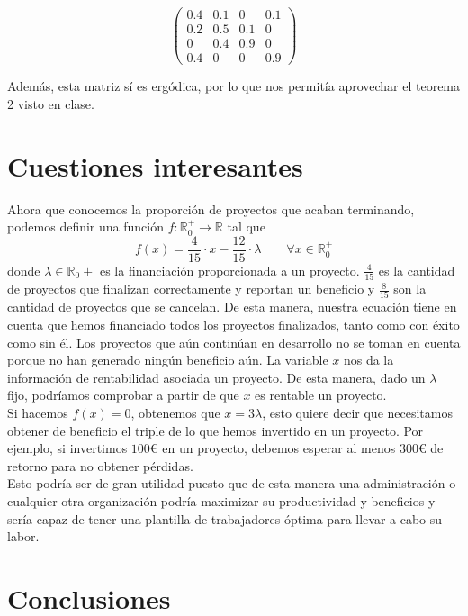 \documentclass[10pt,a4paper]{article}
\begin{document}
\[
\begin{pmatrix}
0.4 & 0.1 & 0 & 0.1 \\
0.2 & 0.5 & 0.1 & 0 \\
0 & 0.4 & 0.9 & 0 \\
0.4 & 0 & 0 & 0.9 
\end{pmatrix}
\]

Además, esta matriz sí es ergódica, por lo que nos permitía aprovechar el teorema 2 visto en clase.

\newpage

\section{Cuestiones interesantes}

Ahora que conocemos la proporción de proyectos que acaban terminando, podemos definir una función \(f: \mathbb{R}_0^+ \to \mathbb{R}\) tal que
\[
	f(x) = 	\frac{4}{15} \cdot x - \frac{12}{15} \cdot \lambda \qquad \forall x \in \mathbb{R}_0^+
\]
donde \(\lambda \in \mathbb{R}_0+\) es la financiación proporcionada a un proyecto. \(\frac{4}{15}\) es la cantidad de proyectos que finalizan correctamente y reportan un beneficio y \(\frac{8}{15}\) son la cantidad de proyectos que se cancelan. De esta manera, nuestra ecuación tiene en cuenta que hemos financiado todos los proyectos finalizados, tanto como con éxito como sin él. Los proyectos que aún continúan en desarrollo no se toman en cuenta porque no han generado ningún beneficio aún. La variable \(x\) nos da la información de rentabilidad asociada un proyecto. De esta manera, dado un \(\lambda\) fijo, podríamos comprobar a partir de que \(x\) es rentable un proyecto. \\

Si hacemos \(f(x) = 0\), obtenemos que \(x = 3 \lambda\), esto quiere decir que necesitamos obtener de beneficio el triple de lo que hemos invertido en un proyecto. Por ejemplo, si invertimos \(100€\) en un proyecto, debemos esperar al menos \(300€\) de retorno para no obtener pérdidas. \\

Esto podría ser de gran utilidad puesto que de esta manera una administración o cualquier otra organización podría maximizar su productividad y beneficios y sería capaz de tener una plantilla de trabajadores óptima para llevar a cabo su labor.

\section{Conclusiones}
\end{document}
